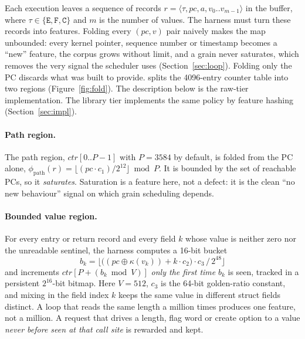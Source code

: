 \documentclass{article}
\begin{document}
Each execution leaves a sequence of records
$r = \langle \tau, \mathit{pc}, a, v_0..v_{m-1}\rangle$ in the buffer, where
$\tau \in \{\texttt{E}, \texttt{F}, \texttt{C}\}$ and $m$ is the number of
values. The harness must turn these records into \libfuzzer features. Folding
every $(\mathit{pc}, v)$ pair naively makes the map unbounded: every kernel
pointer, sequence number or timestamp becomes a ``new'' feature, the corpus
grows without limit, and a grain never saturates, which removes the very
signal the scheduler uses (Section~\ref{sec:loop}). Folding only the PC
discards what \kcovdf was built to provide. \toolname splits the 4096-entry
counter table into two regions (Figure~\ref{fig:fold}). The description below
is the raw-tier implementation. The library tier implements the same policy
by feature hashing (Section~\ref{sec:impl}).

\paragraph{Path region.} The path region,
$\mathit{ctr}[0..P{-}1]$ with $P = 3584$ by default, is folded from the PC
alone, $\phi_\mathrm{path}(r) = \lfloor (\mathit{pc}\cdot c_1)/2^{12}\rfloor \bmod P$.
It is bounded by the set of reachable PCs, so it \emph{saturates}. Saturation
is a feature here, not a defect: it is the clean ``no new behaviour'' signal
on which grain scheduling depends.

\paragraph{Bounded value region.} For every entry or return record and every
field $k$ whose value is neither zero nor the unreadable sentinel, the harness
computes a 16-bit bucket
\[ b_k = \Big\lfloor \big((\mathit{pc} \oplus \kappa(v_k)) + k\cdot c_2\big)\cdot c_3 \,/\, 2^{48} \Big\rfloor \]
and increments $\mathit{ctr}[P + (b_k \bmod V)]$ \emph{only the first time}
$b_k$ is seen, tracked in a persistent $2^{16}$-bit bitmap. Here $V = 512$,
$c_3$ is the 64-bit golden-ratio constant, and mixing in the field index $k$
keeps the same value in different struct fields distinct. A loop that reads
the same length a million times produces one feature, not a million. A
request that drives a length, flag word or create option to a value
\emph{never before seen at that call site} is rewarded and kept.
\end{document}
